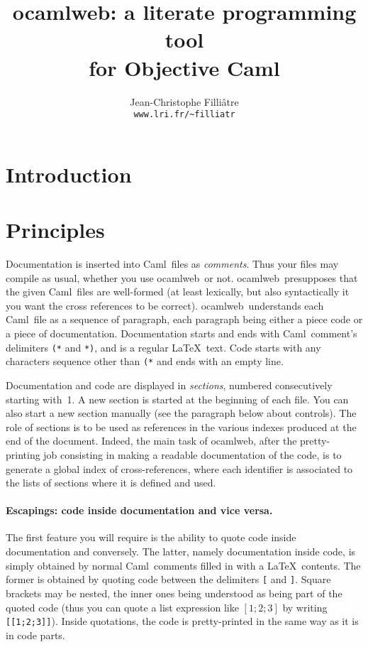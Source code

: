 \documentclass[12pt]{article}
\newcommand{\Caml}{\textsf{Caml}}
\newcommand{\ocamlweb}{\textsf{ocamlweb}}
\begin{document}
\title{ocamlweb: a literate programming tool \\ 
               for Objective Caml}
\author{Jean-Christophe Filli\^{a}tre \\
        \normalsize\texttt{www.lri.fr/\~{}filliatr}}
\date{}
\maketitle

\section{Introduction}


\section{Principles}

Documentation is inserted into \Caml\ files as \emph{comments}.  Thus
your files may compile as usual, whether you use \ocamlweb\ or not.
\ocamlweb\ presupposes that the given \Caml\ files are well-formed (at
least lexically, but also syntactically it you want the cross
references to be correct).  \ocamlweb\ understands each \Caml\ file as
a sequence of paragraph, each paragraph being either a piece code or a
piece of documentation.  Documentation starts and ends with \Caml\ 
comment's delimiters \texttt{(*} and \texttt{*)}, and is a regular
\LaTeX\ text. Code starts with any characters sequence other than
\texttt{(*} and ends with an empty line.

Documentation and code are displayed in \emph{sections}, numbered
consecutively starting with~1. A new section is started at the
beginning of each file. You can also start a new section manually (see
the paragraph below about controls). The role of sections is to be
used as references in the various indexes produced at the end of the
document.
Indeed, the main task of \ocamlweb, after the pretty-printing job
consisting in making a readable documentation of the code, is to
generate a global index of cross-references, where each identifier is
associated to the lists of sections where it is defined and used.


\paragraph{Escapings: code inside documentation and vice versa.}
The first feature you will require is the ability to quote code inside
documentation and conversely. The latter, namely documentation inside
code, is simply obtained by normal \Caml\ comments filled in with a
\LaTeX\ contents. The former is obtained by quoting code between the
delimiters \texttt{[} and \texttt{]}. Square brackets may be nested,
the inner ones being understood as being part of the quoted code (thus
you can quote a list expression like $[1;2;3]$ by writing
\texttt{[[1;2;3]]}). Inside quotations, the code is pretty-printed in
the same way as it is in code parts.
\end{document}

